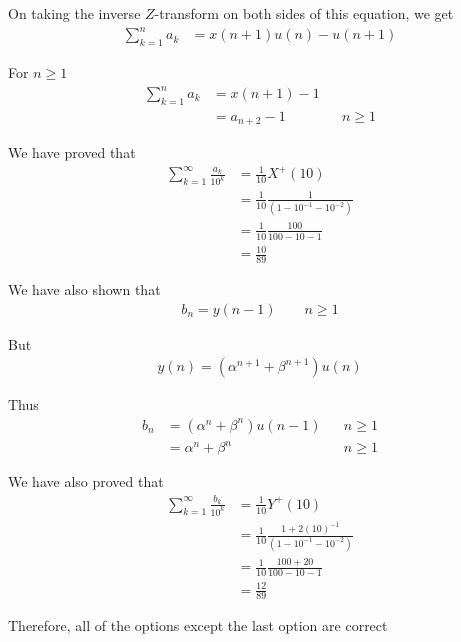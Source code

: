 \documentclass[journal,12pt,twocolumn]{IEEEtran}
\numberwithin{equation}{section}
\renewcommand\thesection{\arabic{section}}
\begin{document}
\begin{enumerate}[label=\thesection.\arabic*,ref=\thesection.\theenumi]
On taking the inverse $Z$-transform on both sides of this equation, we get
\begin{align}
    \sum_{k = 1}^{n}a_k &= x(n+1)u(n) - u(n+1)
\end{align}

For $n \ge 1$
\begin{align}
	\sum_{k = 1}^{n}a_k &= x(n+1) - 1 \\
	&= a_{n+2} - 1 && n \ge 1
\end{align}

We have proved that
\begin{align}
	\sum_{k=1}^\infty \frac{a_k}{10^k} &= \frac{1}{10} X^+(10) \\
	&= \frac{1}{10} \frac{1}{(1 - 10^{-1} - 10^{-2})} \\
	&= \frac{1}{10} \frac{100}{100 - 10 - 1} \\
	&= \frac{10}{89}
\end{align}

We have also shown that
\begin{align}
	b_n = y(n-1) \qquad n \ge 1
\end{align}

But
\begin{align}
	y(n) = (\alpha^{n+1} + \beta^{n+1})u(n)
\end{align}

Thus
\begin{align}
	b_n &= (\alpha^n + \beta^n)u(n-1) && n \ge 1 \\
	&= \alpha^n + \beta^n && n \ge 1
\end{align}

We have also proved that
\begin{align}
	\sum_{k=1}^\infty \frac{b_k}{10^k} &= \frac{1}{10} Y^+(10) \\
	&= \frac{1}{10} \frac{1 + 2(10)^{-1}}{(1 - 10^{-1} - 10^{-2})} \\
	&= \frac{1}{10} \frac{100 + 20}{100 - 10 - 1} \\
	&= \frac{12}{89}
\end{align}

Therefore, all of the options except the last option are correct
\end{enumerate}
\end{document}
